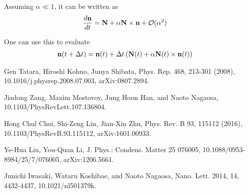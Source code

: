 \documentclass[aps,superscriptaddress,groupedaddress]{revtex4}  %
\begin{document}
Assuming $\alpha \ll 1$, it can be written as
\begin{equation}
\begin{split}
&\frac{d{\bf n}}{dt}={\bf N}+\alpha {\bf N}\times {\bf n}+\mathcal{O}(\alpha ^2)
\end{split}
\end{equation}

One can use this to evaluate
\begin{equation}
\begin{split}
&{\bf n}(t+\Delta t)={\bf n}(t)+\Delta t \left({\bf N}(t)+\alpha {\bf N}(t)\times {\bf n}(t)\right)
\end{split}
\end{equation}

\begin{thebibliography}{99}


Gen Tatara, Hiroshi Kohno, Junya Shibata, Phys. Rep. 468, 213-301 (2008), 10.1016/j.physrep.2008.07.003, arXiv:0807.2894.

Jiadong Zang, Maxim Mostovoy, Jung Hoon Han, and Naoto Nagaosa, 10.1103/PhysRevLett.107.136804.

Hong Chul Choi, Shi-Zeng Lin, Jian-Xin Zhu, Phys. Rev. B 93, 115112 (2016), 10.1103/PhysRevB.93.115112, arXiv:1601.00933.

Ye-Hua Liu, You-Quan Li, J. Phys.: Condens. Matter 25 076005, 10.1088/0953-8984/25/7/076005, arXiv:1206.5661.

Junichi Iwasaki, Wataru Koshibae, and Naoto Nagaosa, Nano. Lett. 2014, 14, 4432-4437, 10.1021/nl501379k.

\end{thebibliography}
\end{document}
